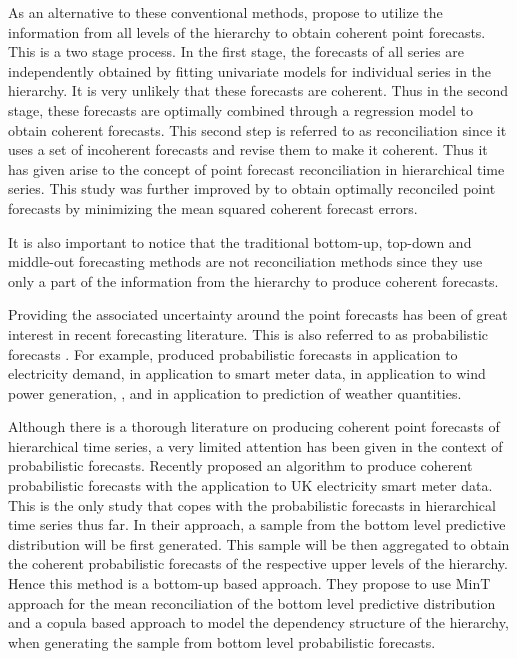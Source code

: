 \documentclass[a4paper, 11pt]{article}
\begin{document}
	As an alternative to these conventional methods, \citet{Hyndman2011} propose to utilize the information from all levels of the hierarchy to obtain coherent point forecasts. This is a two stage process. In the first stage, the forecasts of all series are independently obtained by fitting univariate models for individual series in the hierarchy. It is very unlikely that these forecasts are coherent. Thus in the second stage, these forecasts are optimally combined through a regression model to obtain coherent forecasts. This second step is referred to as reconciliation since it uses a set of incoherent forecasts and revise them to make it coherent. Thus it has given arise to the concept of point forecast reconciliation in hierarchical time series. This study was further improved by \citet{Wickramasuriya2017} to obtain optimally reconciled point forecasts by minimizing the mean squared coherent forecast errors. 
	
	It is also important to notice that the traditional bottom-up, top-down and middle-out forecasting methods are not reconciliation methods since they use only a part of the information from the hierarchy to produce coherent forecasts. 
	
	Providing the associated uncertainty around the point forecasts has been of great interest in recent forecasting literature. This is also referred to as probabilistic forecasts \citep{Gneiting2014}. For example, \citet{McSharry2005} produced probabilistic forecasts in application to electricity demand, \citet{BenTaieb2017} in application to smart meter data, \citet{Pinson2009} in application to wind power generation, \citet{Gel2004}, \citet{Gneiting2005a} and \citet{Gneiting2005} in application to prediction of weather quantities.
	
	Although there is a thorough literature on producing coherent point forecasts of hierarchical time series, a very limited attention has been given in the context of probabilistic forecasts. Recently \citet{BenTaieb2017} proposed an algorithm to produce coherent probabilistic forecasts with the application to UK electricity smart meter data. This is the only study that copes with the probabilistic forecasts in hierarchical time series thus far. In their approach, a sample from the bottom level predictive distribution will be first generated. This sample will be then aggregated to obtain the coherent probabilistic forecasts of the respective upper levels of the hierarchy. Hence this method is a bottom-up based approach. They propose to use MinT approach for the mean reconciliation of the bottom level predictive distribution and a copula based approach to model the dependency structure of the hierarchy, when generating the sample from bottom level probabilistic forecasts.
	
\end{document}
